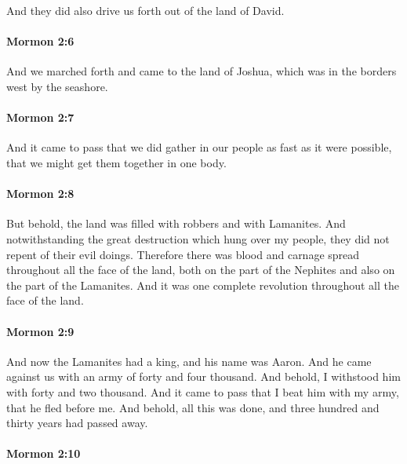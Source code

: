 			And they did also drive us forth out of the land of David.

		\paragraph{Mormon 2:6} %
			\label{MORMON-2-6}

			And we marched forth and came to the land of Joshua,
			which was in the borders west by the seashore.

		\paragraph{Mormon 2:7} %
			\label{MORMON-2-7}

			And it came to pass that we did gather in our people as fast as it were possible,
			that we might get them together in one body.

		\paragraph{Mormon 2:8} %
			\label{MORMON-2-8}

			But behold, the land was filled with robbers and with Lamanites.
			And notwithstanding the great destruction which hung over my people,
			they did not repent of their evil doings.
			Therefore there was blood and carnage spread throughout all the face of the land,
			both on the part of the Nephites and also on the part of the Lamanites.
			And it was one complete revolution throughout all the face of the land.

		\paragraph{Mormon 2:9} %
			\label{MORMON-2-9}

			And now the Lamanites had a king,
			and his name was Aaron.
			And he came against us with an army of forty and four thousand.
			And behold, I withstood him with forty and two thousand.
			And it came to pass that I beat him with my army,
			that he fled before me.
			And behold, all this was done,
			and three hundred and thirty years had passed away.

		\paragraph{Mormon 2:10} %
			\label{MORMON-2-10}

